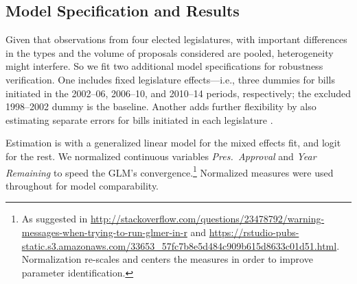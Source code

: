\documentclass[letter,12pt]{article}
\begin{document}

\subsection{Model Specification and Results}

Given that observations from four elected legislatures, with important differences in the types and the volume of proposals considered \citep{aleman.navia.UrgChi.2009} are pooled, heterogeneity might interfere. So we fit two additional model specifications for robustness verification. One includes fixed legislature effects---i.e., three dummies for bills initiated in the 2002--06, 2006--10, and 2010--14 periods, respectively; the excluded 1998--2002 dummy is the baseline. Another adds further flexibility by also estimating separate errors for bills initiated in each legislature \citep[a so-called mixed effects model,][:262,302]{gelman.hill.2007}. 

Estimation is with a generalized linear model for the mixed effects fit, and logit for the rest. We normalized continuous variables \emph{Pres.~Approval} and \emph{Year Remaining} to speed the GLM's convergence.\footnote{As suggested in \url{http://stackoverflow.com/questions/23478792/warning-messages-when-trying-to-run-glmer-in-r} and \url{https://rstudio-pubs-static.s3.amazonaws.com/33653_57fc7b8e5d484c909b615d8633c01d51.html}. Normalization re-scales and centers the measures in order to improve parameter identification.} Normalized measures were used throughout for model comparability.

\end{document}
